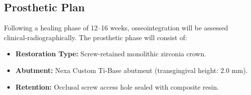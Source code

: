 \subsection{Prosthetic Plan}
Following a healing phase of 12--16 weeks, osseointegration will be assessed clinical-radiographically. The prosthetic phase will consist of:
\begin{itemize}
    \item \textbf{Restoration Type:} Screw-retained monolithic zirconia crown.
    \item \textbf{Abutment:} Nexa Custom Ti-Base abutment (transgingival height: 2.0 mm).
    \item \textbf{Retention:} Occlusal screw access hole sealed with composite resin.
\end{itemize}
